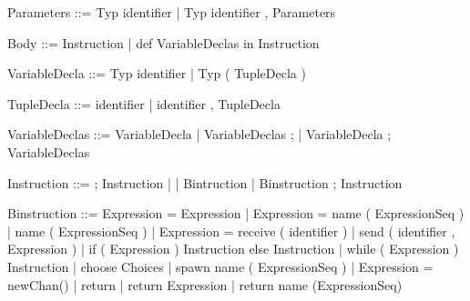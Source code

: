 \documentclass[11pt]{report}
\begin{document}
\begin{verbnobox}[\normalfont]
Parameters ::= Typ identifier | Typ identifier , Parameters
\end{verbnobox}
\vspace*{3pt}

\begin{verbnobox}[\normalfont]
Body ::= { Instruction } | { def VariableDeclas in Instruction }
\end{verbnobox}
\vspace*{3pt}

\begin{verbnobox}[\normalfont]
VariableDecla ::= Typ identifier | Typ ( TupleDecla )
\end{verbnobox}
\vspace*{3pt}

\begin{verbnobox}[\normalfont]
TupleDecla ::= identifier | identifier , TupleDecla
\end{verbnobox}
\vspace*{3pt}

\begin{verbnobox}[\normalfont]
VariableDeclas ::= VariableDecla 
                    | VariableDeclas ; 
                    | VariableDecla ; VariableDeclas
\end{verbnobox}
\vspace*{3pt}

\begin{verbnobox}[\normalfont]
Instruction ::= ; Instruction
               |
               | Bintruction 
               | Binstruction ; Instruction
\end{verbnobox}
\vspace*{3pt}

\begin{verbnobox}[\normalfont]
Binstruction ::= Expression = Expression 
                 | Expression = name ( ExpressionSeq )
                 | name ( ExpressionSeq )
                 | Expression = receive ( identifier )
                 | send ( identifier , Expression )
                 | if ( Expression ) { Instruction } else { Instruction }
                 | while ( Expression ) { Instruction }
                 | choose { Choices }
                 | spawn name ( ExpressionSeq )
                 | Expression = newChan()
                 | return
                 | return Expression
                 | return name (ExpressionSeq)
\end{verbnobox}
\vspace*{3pt}
\end{document}

